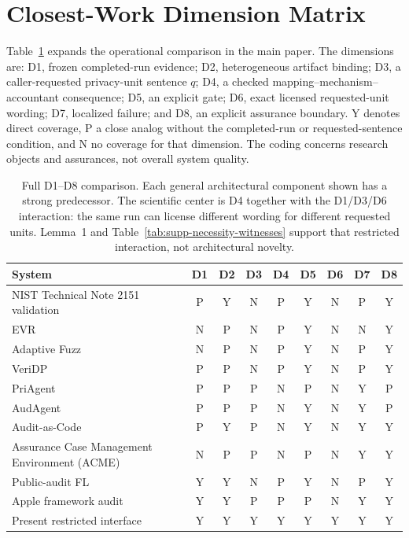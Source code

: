 \documentclass[letterpaper]{article} %
\begin{document}
\onecolumn
\section{Closest-Work Dimension Matrix}
\label{sec:supp-closest-work}

Table~\ref{tab:supp-closest-work} expands the operational comparison in the
main paper.  The dimensions are: D1, frozen completed-run evidence; D2,
heterogeneous artifact binding; D3, a caller-requested privacy-unit sentence
$q$; D4, a checked mapping--mechanism--accountant consequence; D5, an explicit gate;
D6, exact licensed requested-unit wording; D7, localized failure; and D8, an
explicit assurance boundary.  Y denotes direct coverage, P a close analog
without the completed-run or requested-sentence condition, and N no coverage
for that dimension.  The coding concerns research objects and assurances, not
overall system quality.

\begin{table}[H]
\centering
\small
\setlength{\tabcolsep}{5pt}
\begin{tabular}{lcccccccc}
\hline
System & D1 & D2 & D3 & D4 & D5 & D6 & D7 & D8 \\
\hline
NIST Technical Note 2151 validation \citep{ridgeway2021challenge} & P & Y & N & P & Y & N & P & Y \\
EVR \citep{wang2023randomized} & N & P & N & P & Y & N & N & Y \\
Adaptive Fuzz \citep{winogradcort2017adaptive} & N & P & N & P & Y & N & P & Y \\
VeriDP \citep{narayan2015verifiable} & P & P & N & P & Y & N & P & Y \\
PriAgent \citep{zhang2026priagent} & P & P & P & N & P & N & Y & P \\
AudAgent \citep{zheng2026audagent} & P & P & P & N & Y & N & Y & P \\
Audit-as-Code \citep{muhammad2026audit} & P & Y & P & N & Y & N & Y & Y \\
Assurance Case Management Environment (ACME) \citep{wei2024assurance} & N & P & P & N & P & N & Y & Y \\
Public-audit FL \citep{aljabbari2026public} & Y & Y & N & P & Y & N & P & Y \\
Apple framework audit \citep{chourasia2026apple} & Y & Y & P & P & P & N & Y & Y \\
Present restricted interface & Y & Y & Y & Y & Y & Y & Y & Y \\
\hline
\end{tabular}
\caption{Full D1--D8 comparison. Each general architectural component shown has
a strong predecessor. The scientific center is D4 together with the D1/D3/D6
interaction: the same run can license different wording for different
requested units.  Lemma~1 and Table~\ref{tab:supp-necessity-witnesses} support
that restricted interaction, not architectural novelty.}
\label{tab:supp-closest-work}
\end{table}
\end{document}
